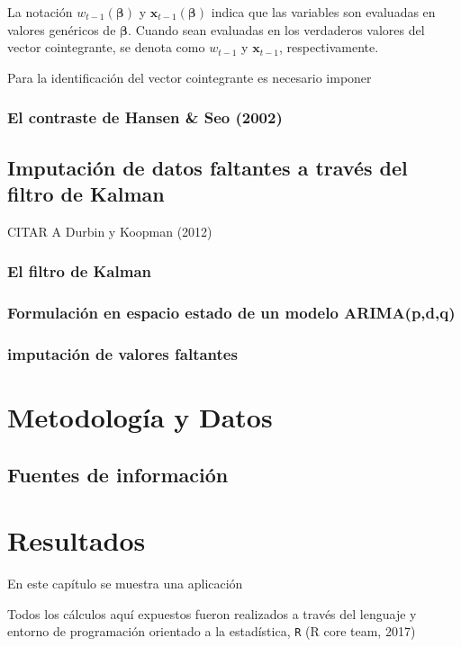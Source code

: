 \documentclass[12pt, twoside]{book}\usepackage[]{graphicx}\usepackage[]{color}
\numberwithin{equation}{section}
\numberwithin{theorem}{section}
\numberwithin{teorema}{section}
\numberwithin{defi}{section}
\numberwithin{prop}{section}
\numberwithin{defi}{section}
\theoremstyle{plain}
\begin{document}
La notación $w_{t-1}(\boldsymbol{\beta})$ y $\mathbf{x}_{t-1}(\boldsymbol{\beta})$ indica que las variables son evaluadas en valores genéricos de $\boldsymbol{\beta}$. Cuando sean evaluadas en los verdaderos valores del vector cointegrante, se denota como $w_{t-1}$ y $\mathbf{x}_{t-1}$, respectivamente. 

Para la identificación del vector cointegrante es necesario imponer 

\subsection{El contraste de Hansen \& Seo (2002)}

\section{Imputación de datos faltantes a través del filtro de Kalman}
CITAR A Durbin y Koopman (2012)
\subsection{El filtro de Kalman}
\subsection{Formulación en espacio estado de un modelo ARIMA(p,d,q)}
\subsection{imputación de valores faltantes}



\chapter{Metodología y Datos}

\section{Fuentes de información}




\chapter{Resultados}

En este capítulo se muestra una aplicación

Todos los cálculos aquí expuestos fueron realizados a través del lenguaje y entorno de programación orientado a la estadística, \texttt{R} (R core team, 2017)
\end{document}
